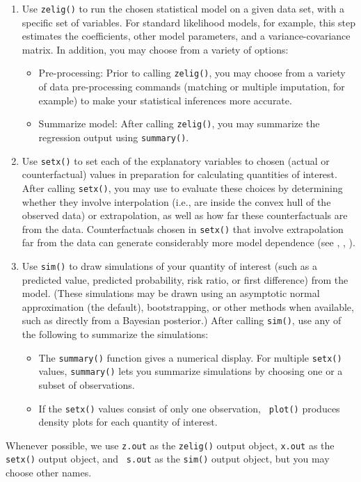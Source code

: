 \begin{enumerate}
\item Use \texttt{zelig()} to run the chosen statistical model on a
given data set, with a specific set of variables.  For standard
likelihood models, for example, this step estimates the coefficients,
other model parameters, and a variance-covariance matrix.  In
addition, you may choose from a variety of options:
\begin{itemize} 
\item Pre-processing:  Prior to calling {\tt zelig()}, you may
  choose from a variety of data pre-processing commands (matching or
  multiple imputation, for example) to make your statistical
  inferences more accurate. 
\item Summarize model: After calling {\tt zelig()}, you may summarize
the regression output using {\tt summary()}.  
\end{itemize}
\item Use \texttt{setx()} to set each of the explanatory variables to
  chosen (actual or counterfactual) values in preparation for
  calculating quantities of interest.  After calling {\tt setx()}, you
  may use  to evaluate these choices by
  determining whether they involve interpolation (i.e., are inside the
  convex hull of the observed data) or extrapolation, as well as how
  far these counterfactuals are from the data.  Counterfactuals chosen
  in \texttt{setx()} that involve extrapolation far from the data can
  generate considerably more model dependence (see \cite{KinZen06a},
  \cite{KinZen06b}, \cite{StoKinZen05}).
\item Use \texttt{sim()} to draw simulations of your quantity of
  interest (such as a predicted value, predicted probability, risk
  ratio, or first difference) from the model.  (These simulations may
  be drawn using an asymptotic normal approximation (the default),
  bootstrapping, or other methods when available, such as directly
  from a Bayesian posterior.)  After calling {\tt sim()}, use any of
the following to summarize the simulations:
\begin{itemize}
\item The {\tt summary()} function gives a numerical display. For
multiple {\tt setx()} values, {\tt summary()} lets you summarize
simulations by choosing one or a subset of observations.
\item If the {\tt setx()} values consist of only one observation, {\tt
plot()} produces density plots for each quantity of interest.  
\end{itemize}
\end{enumerate}
Whenever possible, we use {\tt z.out} as the {\tt zelig()} output
object, \texttt{x.out} as the \texttt{setx()} output object, and {\tt
s.out} as the {\tt sim()} output object, but you may choose other
names.

